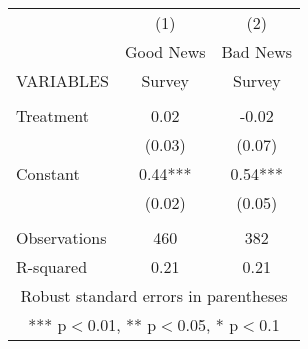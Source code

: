 \begin{tabular}{lcc} \hline
 & (1) & (2) \\
 & Good News & Bad News \\
VARIABLES & Survey & Survey \\ \hline
 &  &  \\
Treatment & 0.02 & -0.02 \\
 & (0.03) & (0.07) \\
Constant & 0.44*** & 0.54*** \\
 & (0.02) & (0.05) \\
 &  &  \\
Observations & 460 & 382 \\
 R-squared & 0.21 & 0.21 \\ \hline
\multicolumn{3}{c}{ Robust standard errors in parentheses} \\
\multicolumn{3}{c}{ *** p$<$0.01, ** p$<$0.05, * p$<$0.1} \\
\end{tabular}
